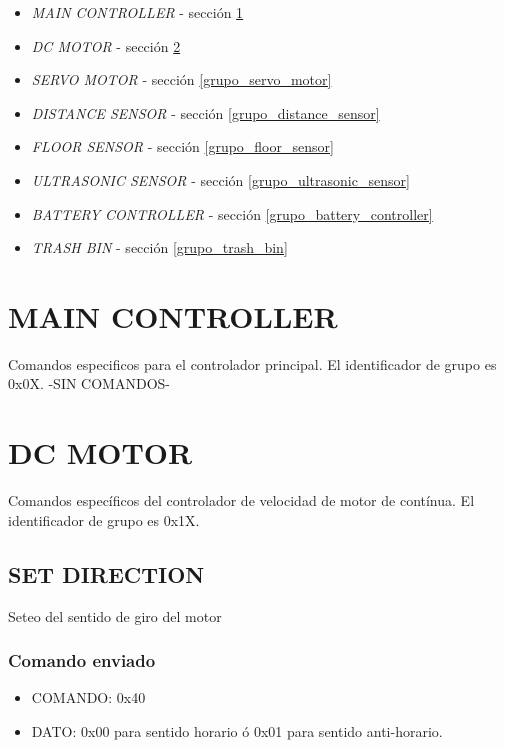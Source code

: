 \documentclass[a4paper,10pt]{article}
\begin{document}
\begin{itemize}
	\item \emph{MAIN CONTROLLER} - secci\'on \ref{grupo_main_controller}
	\item \emph{DC MOTOR} - secci\'on \ref{grupo_dc_motor}
	\item \emph{SERVO MOTOR} - secci\'on \ref{grupo_servo_motor}
	\item \emph{DISTANCE SENSOR} - secci\'on \ref{grupo_distance_sensor}
	\item \emph{FLOOR SENSOR} - secci\'on \ref{grupo_floor_sensor}
	\item \emph{ULTRASONIC SENSOR} - secci\'on \ref{grupo_ultrasonic_sensor}
	\item \emph{BATTERY CONTROLLER} - secci\'on \ref{grupo_battery_controller}
	\item \emph{TRASH BIN} - secci\'on \ref{grupo_trash_bin}
\label{grupos_listado}
\end{itemize}

\section{MAIN CONTROLLER}
\label{grupo_main_controller}

Comandos especificos para el controlador principal.
El identificador de grupo es 0x0X.
-SIN COMANDOS-

\section{DC MOTOR}
\label{grupo_dc_motor}

Comandos espec\'ificos del controlador de velocidad de motor de cont\'inua.
El identificador de grupo es 0x1X.

\subsection{SET DIRECTION}
\label{set_direction}

Seteo del sentido de giro del motor

\subsubsection*{Comando enviado}

\begin{itemize}
	\item{COMANDO:} 0x40
	\item{DATO:} 0x00 para sentido horario \'o 0x01 para sentido anti-horario.
\end{itemize}
\end{document}
